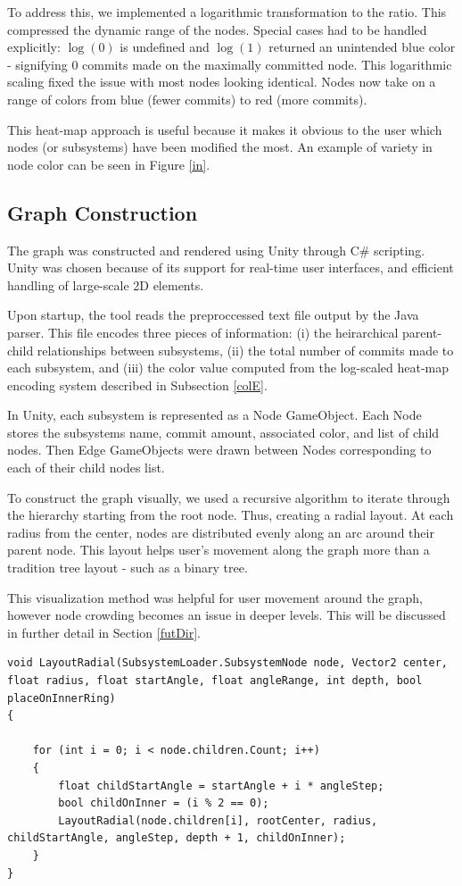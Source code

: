 \documentclass[conference]{IEEEtran}
\begin{document}
To address this, we implemented a logarithmic transformation to the ratio. This compressed the dynamic range of the nodes. Special cases had to be handled explicitly: $\log(0)$ is undefined and $\log(1)$ returned an unintended blue color - signifying $0$ commits made on the maximally committed node. This logarithmic scaling fixed the issue with most nodes looking identical. Nodes now take on a range of colors from blue (fewer commits) to red (more commits).

 This heat-map approach is useful because it makes it obvious to the user which nodes (or subsystems) have been modified the most. An example of variety in node color can be seen in Figure \ref{in}.



\subsection{Graph Construction}
\label{graphC}
The graph was constructed and rendered using Unity through C\# scripting. Unity was chosen because of its support for real-time user interfaces, and efficient handling of large-scale 2D elements.

Upon startup, the tool reads the preproccessed text file output by the Java parser. This file encodes three pieces of information: (i) the heirarchical parent-child relationships between subsystems, (ii) the total number of commits made to each subsystem, and (iii) the color value computed from the log-scaled heat-map encoding system described in Subsection \ref{colE}.

In Unity, each subsystem is represented as a Node GameObject. Each Node stores the subsystems name, commit amount, associated color, and list of child nodes. Then Edge GameObjects were drawn between Nodes corresponding to each of their child nodes list.

To construct the graph visually, we used a recursive algorithm to iterate through the hierarchy starting from the root node. Thus, creating a radial layout. At each radius from the center, nodes are distributed evenly along an arc around their parent node. This layout helps user's movement along the graph more than a tradition tree layout - such as a binary tree. 

This visualization method was helpful for user movement around the graph, however node crowding becomes an issue in deeper levels. This will be discussed in further detail in Section \ref{futDir}.

\begin{lstlisting}[caption={Recursive portion of radial layout code in C\#}, label={lst:layoutRadial}]
void LayoutRadial(SubsystemLoader.SubsystemNode node, Vector2 center, float radius, float startAngle, float angleRange, int depth, bool placeOnInnerRing)
{

    for (int i = 0; i < node.children.Count; i++)
    {
        float childStartAngle = startAngle + i * angleStep;
        bool childOnInner = (i % 2 == 0);
        LayoutRadial(node.children[i], rootCenter, radius, childStartAngle, angleStep, depth + 1, childOnInner);
    }
}
\end{lstlisting}
\end{document}
